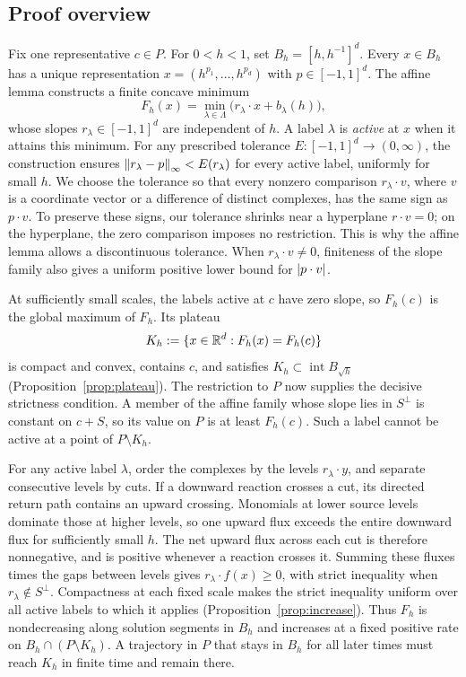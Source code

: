 \subsection{Proof overview}

Fix one representative $c\in P$. For $0<h<1$, set
$B_h=[h,h^{-1}]^d$. Every $x\in B_h$ has a unique representation
$x=(h^{p_1},\ldots,h^{p_d})$ with $p\in[-1,1]^d$. The affine lemma
constructs a finite concave minimum
\[
  F_h(x)=\min_{\lambda\in\Lambda}
     \bigl(r_\lambda\cdot x+b_\lambda(h)\bigr),
\]
whose slopes $r_\lambda\in[-1,1]^d$ are independent of $h$. A label
$\lambda$ is \emph{active} at $x$ when it attains this minimum.
For any prescribed tolerance $E:[-1,1]^d\to(0,\infty)$, the construction
ensures
$\left\|r_\lambda-p\right\|_\infty<E(r_\lambda)$ for every active label,
uniformly for small $h$. We choose the tolerance so that every nonzero
comparison $r_\lambda\cdot v$, where $v$ is a coordinate vector or a
difference of distinct complexes, has the same sign as $p\cdot v$.
To preserve these signs, our tolerance shrinks near a hyperplane
$r\cdot v=0$; on the hyperplane, the zero comparison imposes no
restriction. This is why the affine lemma allows a discontinuous
tolerance. When $r_\lambda\cdot v\ne0$, finiteness of the slope family
also gives a uniform positive lower bound for $\left|p\cdot v\right|$.

At sufficiently small scales, the labels active at $c$ have zero slope,
so $F_h(c)$ is the global maximum of $F_h$. Its plateau
\[
  K_h:=\{x\in\mathbb R^d:F_h(x)=F_h(c)\}
\]
is compact and convex, contains $c$, and satisfies
$K_h\subset\operatorname{int}B_{\sqrt h}$
(Proposition~\ref{prop:plateau}). The restriction to $P$ now supplies
the decisive strictness condition. A member of the affine family whose slope lies
in $S^\perp$ is constant on $c+S$, so its value on $P$ is at least
$F_h(c)$. Such a label cannot be active at a point of $P\setminus K_h$.

For any active label $\lambda$, order the complexes by the levels
$r_\lambda\cdot y$, and separate consecutive levels by cuts. If a
downward reaction crosses a cut, its directed return path contains an
upward crossing. Monomials at lower source levels dominate those at
higher levels, so one upward flux exceeds the entire downward flux for
sufficiently small $h$. The net upward flux across each cut is therefore
nonnegative, and is positive whenever a reaction crosses it. Summing
these fluxes times the gaps between levels gives
$r_\lambda\cdot f(x)\geq0$, with strict inequality when
$r_\lambda\notin S^\perp$. Compactness at each fixed scale makes the
strict inequality uniform over all active labels to which it applies
(Proposition~\ref{prop:increase}). Thus $F_h$ is nondecreasing along
solution segments in $B_h$ and increases at a fixed positive rate on
$B_h\cap(P\setminus K_h)$. A trajectory in $P$ that stays in $B_h$
for all later times must reach $K_h$ in finite time and remain there.

